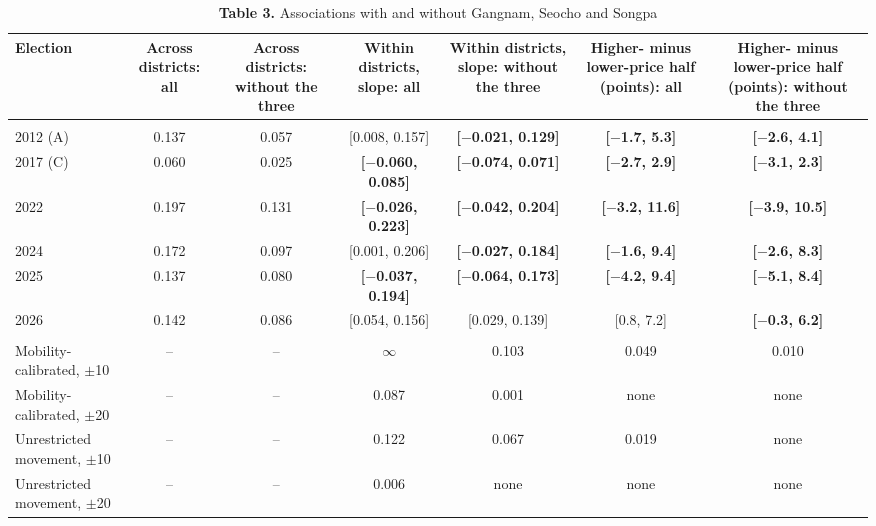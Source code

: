 \begin{table}[!htbp]
\centering
\footnotesize
\setlength{\tabcolsep}{3.5pt}
\caption*{\textbf{Table 3.} Associations with and without Gangnam, Seocho and Songpa}
\begin{tabularx}{\linewidth}{lCCCCCC}
\toprule
Election & Across districts: all & Across districts: without the three & Within districts, slope: all & Within districts, slope: without the three & Higher- minus lower-price half (points): all & Higher- minus lower-price half (points): without the three \\
\midrule
\addlinespace[3pt] \\
2012 (A) & 0.137 & 0.057 & [0.008, 0.157] & \textbf{[$-$0.021, 0.129]} & \textbf{[$-$1.7, 5.3]} & \textbf{[$-$2.6, 4.1]} \\
2017 (C) & 0.060 & 0.025 & \textbf{[$-$0.060, 0.085]} & \textbf{[$-$0.074, 0.071]} & \textbf{[$-$2.7, 2.9]} & \textbf{[$-$3.1, 2.3]} \\
2022 & 0.197 & 0.131 & \textbf{[$-$0.026, 0.223]} & \textbf{[$-$0.042, 0.204]} & \textbf{[$-$3.2, 11.6]} & \textbf{[$-$3.9, 10.5]} \\
2024 & 0.172 & 0.097 & [0.001, 0.206] & \textbf{[$-$0.027, 0.184]} & \textbf{[$-$1.6, 9.4]} & \textbf{[$-$2.6, 8.3]} \\
2025 & 0.137 & 0.080 & \textbf{[$-$0.037, 0.194]} & \textbf{[$-$0.064, 0.173]} & \textbf{[$-$4.2, 9.4]} & \textbf{[$-$5.1, 8.4]} \\
2026 & 0.142 & 0.086 & [0.054, 0.156] & [0.029, 0.139] & [0.8, 7.2] & \textbf{[$-$0.3, 6.2]} \\
\addlinespace[3pt] \\
Mobility-calibrated, $\pm $10 & -- & -- & $\infty $ & 0.103 & 0.049 & 0.010 \\
Mobility-calibrated, $\pm $20 & -- & -- & 0.087 & 0.001 & none & none \\
Unrestricted movement, $\pm $10 & -- & -- & 0.122 & 0.067 & 0.019 & none \\
Unrestricted movement, $\pm $20 & -- & -- & 0.006 & none & none & none \\
\bottomrule
\end{tabularx}

\end{table}
